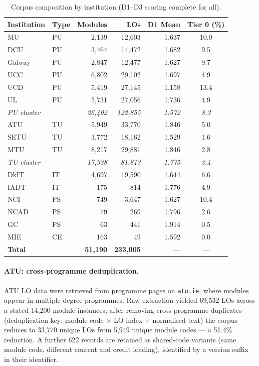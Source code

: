 \documentclass[12pt, a4paper]{article}
\begin{document}
\begin{table}[H]
\centering
\caption{Corpus composition by institution (D1--D3 scoring complete for all).}
\label{tab:corpus}
\begin{tabular}{llrrrc}
\toprule
\textbf{Institution} & \textbf{Type} & \textbf{Modules} & \textbf{LOs} & \textbf{D1 Mean} & \textbf{Tier 0 (\%)} \\
\midrule
MU      & PU & 2,139  & 12,603 & 1.637 & 10.0 \\
DCU     & PU & 3,464  & 14,472 & 1.682 &  9.5 \\
Galway  & PU & 2,847  & 12,477 & 1.627 &  9.7 \\
UCC     & PU & 6,802  & 29,102 & 1.697 &  4.9 \\
UCD     & PU & 5,419  & 27,145 & 1.158 & 13.4 \\
UL      & PU & 5,731  & 27,056 & 1.736 &  4.9 \\
\midrule
\textit{PU cluster} & & \textit{26,402} & \textit{122,855} & \textit{1.572} & \textit{8.3} \\
\midrule
ATU     & TU & 5,949  & 33,770 & 1.846 & 5.0 \\
SETU    & TU &  3,772 & 18,162 & 1.529 & 1.6 \\
MTU     & TU &  8,217 & 29,881 & 1.846 & 2.8 \\
\midrule
\textit{TU cluster} & & \textit{17,938} & \textit{81,813} & \textit{1.775} & \textit{3.4} \\
\midrule
DkIT    & IT &  4,697 & 19,590 & 1.644 & 6.6 \\
IADT    & IT &    175 &    814 & 1.776 &  4.9 \\
\midrule
NCI     & PS &    749 &  3,647 & 1.627 & 10.4 \\
NCAD    & PS &     79 &    269 & 1.796 &  2.6 \\
GC      & PS &     63 &    441 & 1.914 &  0.5 \\
MIE     & CE &   163 &     49 & 1.592 &  0.0 \\
\midrule
\textbf{Total} & & \textbf{51,190} & \textbf{233,005} & --- & --- \\
\bottomrule
\end{tabular}
\end{table}

\paragraph{ATU: cross-programme deduplication.}
ATU LO data were retrieved from programme pages on \texttt{atu.ie}, where modules
appear in multiple degree programmes. Raw extraction yielded 69,532 LOs across a
stated 14,200 module instances; after removing cross-programme duplicates
(deduplication key: module code $\times$ LO index $\times$ normalised text) the
corpus reduces to 33,770 unique LOs from 5,949 unique module codes --- a 51.4\%
reduction. A further 622 records are retained as shared-code variants (same module
code, different content and credit loading), identified by a version suffix in their
identifier.
\end{document}
